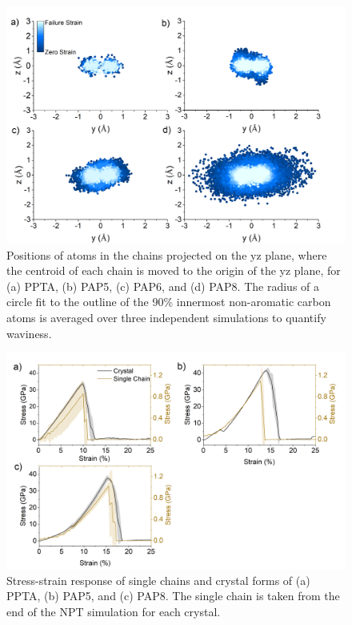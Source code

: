 \documentclass[journal=langd5,manuscript=article]{achemso}
\begin{document}
\begin{figure}[h!]
\centering
\includegraphics[scale=0.55]{Figure S1 sideviews.png}
\caption{Positions of atoms in the chains projected on the yz plane, where the centroid of each chain is moved to the origin of the yz plane, for (a) PPTA, (b) PAP5, (c) PAP6, and (d) PAP8. The radius of a circle fit to the outline of the 90\% innermost non-aromatic carbon atoms is averaged over three independent simulations to quantify waviness. 
}
\label{fig:sideviews}
\end{figure}

\begin{figure}[h!]
\centering
\includegraphics[scale=0.55]{Figure S2 SingleAndCrystal-PPTA-PAP5-PAP8.png}
\caption{Stress-strain response of single chains and crystal forms of (a) PPTA, (b) PAP5, and (c) PAP8. The single chain is taken from the end of the NPT simulation for each crystal.
}
\label{fig:SingleAndCrystal-PPTA-PAP5-PAP8}
\end{figure}
\end{document}
